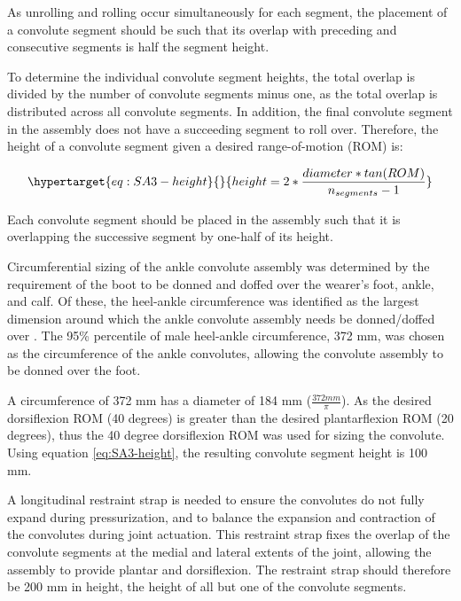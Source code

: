 \documentclass[defaultstyle,11pt]{thesis}
\begin{document}
As unrolling and rolling occur simultaneously for each segment, the placement of a convolute segment should be such that its overlap with preceding and consecutive segments is half the segment height.

To determine the individual convolute segment heights, the total overlap is divided by the number of convolute segments minus one, as the total overlap is distributed across all convolute segments.
In addition, the final convolute segment in the assembly does not have a succeeding segment to roll over.
Therefore, the height of a convolute segment given a desired range-of-motion (ROM) is:

\begin{equation}\protect\hypertarget{eq:SA3-height}{}{
height = 2*\frac{diameter * tan(ROM)}{n_{segments}-1}
}\label{eq:SA3-height}\end{equation}

Each convolute segment should be placed in the assembly such that it is overlapping the successive segment by one-half of its height.

Circumferential sizing of the ankle convolute assembly was determined by the requirement of the boot to be donned and doffed over the wearer's foot, ankle, and calf.
Of these, the heel-ankle circumference was identified as the largest dimension around which the ankle convolute assembly needs be donned/doffed over \citep{Gordon2014}.
The 95\% percentile of male heel-ankle circumference, 372 mm, was chosen as the circumference of the ankle convolutes, allowing the convolute assembly to be donned over the foot.

A circumference of 372 mm has a diameter of 184 mm (\(\frac{372mm}{\pi}\)).
As the desired dorsiflexion ROM (40 degrees) is greater than the desired plantarflexion ROM (20 degrees), thus the 40 degree dorsiflexion ROM was used for sizing the convolute.
Using equation \ref{eq:SA3-height}, the resulting convolute segment height is 100 mm.

A longitudinal restraint strap is needed to ensure the convolutes do not fully expand during pressurization, and to balance the expansion and contraction of the convolutes during joint actuation.
This restraint strap fixes the overlap of the convolute segments at the medial and lateral extents of the joint, allowing the assembly to provide plantar and dorsiflexion.
The restraint strap should therefore be 200 mm in height, the height of all but one of the convolute segments.
\end{document}

